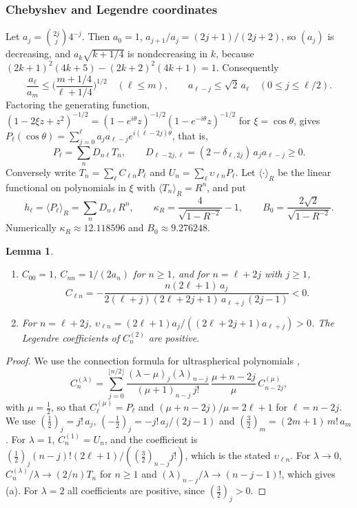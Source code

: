 \documentclass[11pt]{amsart}
\newtheorem{lemma}[theorem]{Lemma}
\theoremstyle{definition}
\theoremstyle{remark}
\numberwithin{equation}{section}
\begin{document}
\subsubsection*{Chebyshev and Legendre coordinates}
Let $a_j=\binom{2j}j4^{-j}$. Then $a_0=1$, $a_{j+1}/a_j=(2j+1)/(2j+2)$, so $(a_j)$ is decreasing, and $a_k\sqrt{k+1/4}$ is nondecreasing in $k$, because $(2k+1)^2(4k+5)-(2k+2)^2(4k+1)=1$. Consequently
\begin{equation}\label{r3:eq-aratio}
\frac{a_\ell}{a_m}\leq\Big(\frac{m+1/4}{\ell+1/4}\Big)^{1/2}\quad(\ell\leq m),\qquad a_{\ell-j}\leq\sqrt2\,a_\ell\quad(0\leq j\leq\ell/2).
\end{equation}
Factoring the generating function, $(1-2\xi z+z^2)^{-1/2}=(1-e^{i\theta}z)^{-1/2}(1-e^{-i\theta}z)^{-1/2}$ for $\xi=\cos\theta$, gives $P_\ell(\cos\theta)=\sum_{j=0}^\ell a_ja_{\ell-j}e^{i(\ell-2j)\theta}$, that is,
\[
P_\ell=\sum_nD_{n\ell}T_n,\qquad D_{\ell-2j,\ell}=(2-\delta_{\ell,2j})\,a_ja_{\ell-j}\geq0 .
\]
Conversely write $T_n=\sum_\ell C_{\ell n}P_\ell$ and $U_n=\sum_\ell\upsilon_{\ell n}P_\ell$. Let $\langle\cdot\rangle_R$ be the linear functional on polynomials in $\xi$ with $\langle T_n\rangle_R=R^n$, and put
\[
h_\ell=\langle P_\ell\rangle_R=\sum_nD_{n\ell}R^n,\qquad \kappa_R=\frac4{\sqrt{1-R^{-2}}}-1,\qquad B_0=\frac{2\sqrt2}{\sqrt{1-R^{-2}}} .
\]
Numerically $\kappa_R\approx12.118596$ and $B_0\approx9.276248$.

\begin{lemma}\label{r3:lem-connection}
\begin{enumerate}[label=\textup{(\alph*)}]
\item $C_{00}=1$, $C_{nn}=1/(2a_n)$ for $n\geq1$, and for $n=\ell+2j$ with $j\geq1$,
\[
C_{\ell n}=-\frac{n(2\ell+1)\,a_j}{2(\ell+j)(2\ell+2j+1)\,a_{\ell+j}\,(2j-1)}<0 .
\]
\item For $n=\ell+2j$, $\upsilon_{\ell n}=(2\ell+1)a_j/((2\ell+2j+1)a_{\ell+j})>0$. The Legendre coefficients of $C^{(2)}_n$ are positive.
\end{enumerate}
\end{lemma}

\begin{proof}
We use the connection formula for ultraspherical polynomials \cite[18.18.16]{DLMF},
\[
C^{(\lambda)}_n=\sum_{j=0}^{\lfloor n/2\rfloor}\frac{(\lambda-\mu)_j(\lambda)_{n-j}}{(\mu+1)_{n-j}\,j!}\,\frac{\mu+n-2j}{\mu}\,C^{(\mu)}_{n-2j},
\]
with $\mu=\frac12$, so that $C^{(\mu)}_\ell=P_\ell$ and $(\mu+n-2j)/\mu=2\ell+1$ for $\ell=n-2j$. We use $(\frac12)_j=j!\,a_j$, $(-\frac12)_j=-j!\,a_j/(2j-1)$ and $(\frac32)_m=(2m+1)\,m!\,a_m$. For $\lambda=1$, $C^{(1)}_n=U_n$, and the coefficient is $(\frac12)_j(n-j)!(2\ell+1)/((\frac32)_{n-j}j!)$, which is the stated $\upsilon_{\ell n}$. For $\lambda\to0$, $C^{(\lambda)}_n/\lambda\to(2/n)T_n$ for $n\geq1$ \cite[\S18.7(iii)]{DLMF} and $(\lambda)_{n-j}/\lambda\to(n-j-1)!$, which gives (a). For $\lambda=2$ all coefficients are positive, since $(\frac32)_j>0$.
\end{proof}
\end{document}
